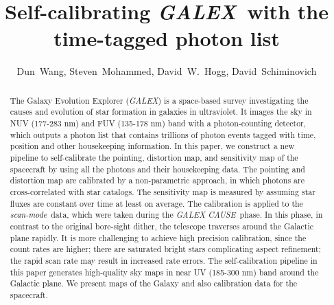 \documentclass[12pt, preprint]{aastex}
\newcommand{\project}[1]{\textsl{#1}}
\newcommand{\galex}{\project{GALEX}}
\newcommand{\cause}{\project{GALEX CAUSE}}
\newcommand{\scanmode}{\project{scan-mode}}
\begin{document}
\title{Self-calibrating \galex\ with the time-tagged photon list}
\author{%
  Dun~Wang\altaffilmark{\ref{CCPP}},
  Steven~Mohammed\altaffilmark{\ref{CU}},
  David~W.~Hogg\altaffilmark{\ref{CCPP},\ref{CDS},\ref{MPIA},\ref{CCA}},
  David~Schiminovich\altaffilmark{\ref{CU}}
  }
\setcounter{address}{1}

\begin{abstract}
The Galaxy Evolution Explorer (\galex) is a space-based survey investigating the causes and evolution of star formation in galaxies in ultraviolet. 
It images the sky in NUV (177-283 nm) and FUV (135-178 nm) band with a photon-counting detector, which outputs a photon list that contains trillions of photon events tagged with time, position and other housekeeping information.
In this paper, we construct a new pipeline to self-calibrate the pointing,  distortion map, and sensitivity map of the spacecraft by using all the photons and their housekeeping data.
The pointing and distortion map are calibrated by a non-parametric approach, in which photons are cross-correlated with star catalogs.
The sensitivity map is measured by assuming star fluxes are constant over time at least on average.
The calibration is applied to the \scanmode\ data, which were taken during the \cause\ phase.
In this phase, in contrast to the original bore-sight dither, the telescope traverses around the Galactic plane rapidly. 
It is more challenging to achieve high precision calibration, since the count rates are higher; there are saturated bright stars complicating aspect refinement; the rapid scan rate may result in increased rate errors.
The self-calibration pipeline in this paper generates high-quality sky maps in near UV (185-300 nm) band around the Galactic plane.
We present maps of the Galaxy and also calibration data for the spacecraft.

\end{abstract}
\end{document}
